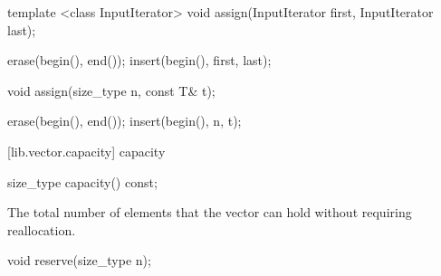 %
\begin{itemdecl}
template <class InputIterator>
  void assign(InputIterator first, InputIterator last);
\end{itemdecl}

\begin{itemdescr}
\pnum
\effects
\begin{codeblock}
    erase(begin(), end());
    insert(begin(), first, last);
\end{codeblock}
\end{itemdescr}

%
%
\begin{itemdecl}
void assign(size_type n, const T& t);
\end{itemdecl}

\begin{itemdescr}
\pnum
\effects
\begin{codeblock}
    erase(begin(), end());
    insert(begin(), n, t);
\end{codeblock}
\end{itemdescr}

[lib.vector.capacity]{ capacity}

%
\begin{itemdecl}
size_type capacity() const;
\end{itemdecl}

\begin{itemdescr}
\pnum
\returns
The total number of elements that the vector can hold
without requiring reallocation.
\end{itemdescr}

%
\begin{itemdecl}
void reserve(size_type n);
\end{itemdecl}

